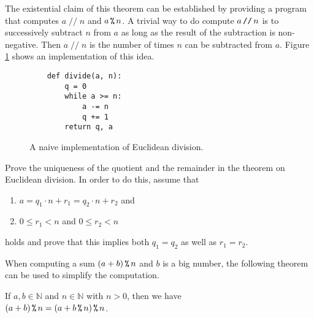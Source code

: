 The existential claim of this theorem can be established by providing a program that computes $a \;\texttt{//}\; n$ and $a \,\texttt{\%}\, n$.  
A trivial way to do compute $a \,\texttt{//}\, n$ is to successively subtract
$n$ from $a$ as long as the result of the subtraction is non-negative.  Then $a \;\texttt{//}\; n$ is the number of times $n$ can be
subtracted from $a$.  Figure \ref{fig:Division-Naive.ipynb} shows an implementation of this idea.

\begin{figure}[!ht]
\centering
\begin{verbatim}
    def divide(a, n):
        q = 0
        while a >= n:
            a -= n
            q += 1
        return q, a
\end{verbatim}
\vspace*{-0.3cm}
\caption{A naive implementation of Euclidean division.}
\label{fig:Division-Naive.ipynb}
\end{figure}
\exercise
Prove the uniqueness of the quotient and the remainder in the theorem on Euclidean division.
In order to do this, assume that
\begin{enumerate}
\item $a = q_1 \cdot n + r_1 = q_2 \cdot n + r_2$ and
\item $0 \leq r_1 < n$ and $0 \leq r_2 < n$
\end{enumerate}
holds and prove that this implies both $q_1 = q_2$ as well as $r_1 = r_2$.  \eox

When computing a sum $(a + b) \,\texttt{\%}\, n$ and $b$ is a big number, the following theorem can be used to simplify
the computation.

\begin{Theorem}
  If $a, b \in \mathbb{N}$ and $n \in \mathbb{N}$ with $n > 0$, then we have
  \\[0.2cm]
  \hspace*{1.3cm}
  $\displaystyle (a + b) \,\texttt{\%}\, n = (a + b \,\texttt{\%}\, n) \,\texttt{\%}\, n$.
\end{Theorem}


